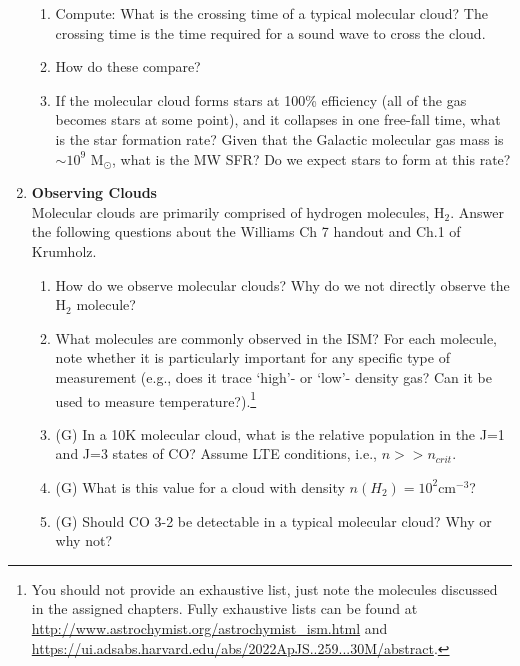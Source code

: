 \documentclass{article}
\newcommand{\msun}{\ensuremath{\mathrm{M}_\odot}\xspace}
\begin{document}
\begin{enumerate}
\begin{enumerate}
    \item Compute: What is the crossing time of a typical molecular cloud?  The
        crossing time is the time required for a sound wave to cross the cloud.
    \item How do these compare?
    \item If the molecular cloud forms stars at 100\% efficiency (all of the
        gas becomes stars at some point), and it collapses in one free-fall
        time, what is the star formation rate?
        Given that the Galactic molecular gas mass is $\sim10^9$ \msun, what is the MW SFR?
        Do we expect stars to form at this rate?
\end{enumerate}

\item  \textbf{Observing Clouds} \\
    Molecular clouds are primarily comprised of hydrogen molecules, H$_2$.
    Answer the following questions about the Williams Ch 7 handout
    and Ch.1 of Krumholz.

    \begin{enumerate}
        \item How do we observe molecular clouds?
            Why do we not directly observe the H$_2$ molecule?
        \item What molecules are commonly observed in the ISM?
            For each molecule, note whether it is particularly important for any specific type
            of measurement (e.g., does it trace `high'- or `low'- density gas?  Can it be
            used to measure temperature?).\footnote{
            You should not provide an exhaustive list, just note the molecules discussed in the
            assigned chapters.  Fully exhaustive lists can be found at
            \url{http://www.astrochymist.org/astrochymist_ism.html} and
            \url{https://ui.adsabs.harvard.edu/abs/2022ApJS..259...30M/abstract}.}
        \item (G) In a 10K molecular cloud, what is the relative population in the J=1 and J=3 states of CO?
            Assume LTE conditions, i.e., $n>>n_{crit}$.
        \item (G) What is this value for a cloud with density $n(H_2)=10^2 \mathrm{cm}^{-3}$?
        \item (G) Should CO 3-2 be detectable in a typical molecular cloud?  Why or why not?
    \end{enumerate}


\end{enumerate}
\end{document}
